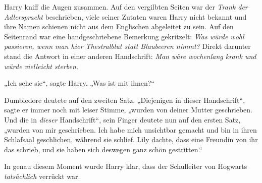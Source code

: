 Harry kniff die Augen zusammen. Auf den vergilbten Seiten war der \emph{Trank der Adlerspracht} beschrieben, viele seiner Zutaten waren Harry nicht bekannt und ihre Namen schienen nicht aus dem Englischen abgeleitet zu sein.%
Auf den Seitenrand war eine handgeschriebene Bemerkung gekritzelt: \emph{Was würde wohl passieren, wenn man hier Thestralblut statt Blaubeeren nimmt?} Direkt darunter stand die Antwort in einer anderen Handschrift: \emph{Man wäre wochenlang krank und würde vielleicht sterben.}

„Ich sehe sie“, sagte Harry.
„Was ist mit ihnen?“

Dumbledore deutete auf den zweiten Satz.
„Diejenigen in dieser Handschrift“, sagte er immer noch mit leiser Stimme, „wurden von deiner Mutter geschrieben. Und die in \emph{dieser} Handschrift“, sein Finger deutete nun auf den ersten Satz, „wurden von mir geschrieben. Ich habe mich unsichtbar gemacht und bin in ihren Schlafsaal geschlichen, während sie schlief. Lily dachte, dass eine Freundin von ihr das schrieb, und sie haben sich deswegen ganz schön gestritten.“

In genau diesem Moment wurde Harry klar, dass der Schulleiter von Hogwarts \emph{tatsächlich} verrückt war.

